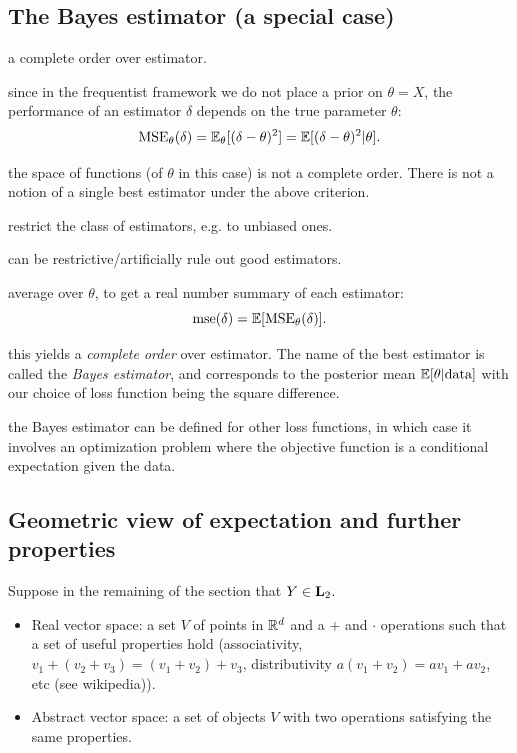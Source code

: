 \documentclass{article}
\begin{document}
\subsection{The Bayes estimator (a special case)}

 a complete order over estimator. 

 since in the frequentist framework we do not place a prior on $\theta = X$, the performance of an estimator $\delta$ depends on the true parameter $\theta$:
\[ \text{MSE}_\theta(\delta) = {\mathbb E}_\theta[(\delta - \theta)^2] = {\mathbb E}[(\delta - \theta)^2 | \theta]. \]

 the space of functions (of $\theta$ in this case) is not a complete order. There is not a notion of a single best estimator under the above criterion.

 restrict the class of estimators, e.g. to unbiased ones.

 can be restrictive/artificially rule out good estimators. 

 average over $\theta$, to get a real number summary of each estimator:
\[ \text{mse}(\delta) = {\mathbb E}[ \text{MSE}_\theta(\delta) ]. \]

 this yields a \emph{complete order} over estimator. The name of the best estimator is called the \emph{Bayes estimator}, and corresponds to the posterior mean ${\mathbb E}[\theta | \text{data}]$ with our choice of loss function being the square difference. 

 the Bayes estimator can be defined for other loss functions, in which case it involves an optimization problem where the objective function is a conditional expectation given the data.


\subsection{Geometric view of expectation and further properties}

Suppose in the remaining of the section that $Y \in \mathbf L_2$. 

\begin{itemize}
  \item Real vector space: a set $V$ of points in ${\mathbb R}^d$ and a $+$ and $\cdot$ operations such that a set of useful properties hold (associativity, $v_1 + (v_2 + v_3) = (v_1 + v_2) + v_3$, distributivity $a(v_1 + v_2) = a v_1 + a v_2$, etc (see wikipedia)).
  \item Abstract vector space: a set of objects $V$ with two operations satisfying the same properties.
\end{itemize}
\end{document}
